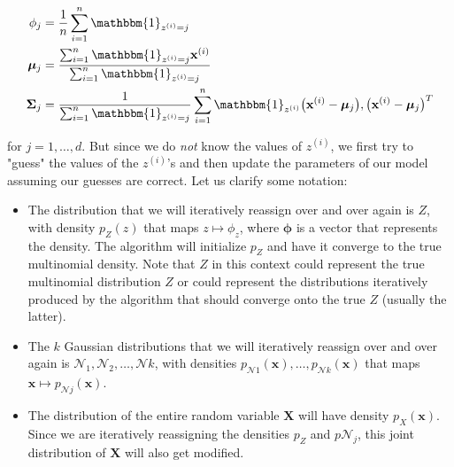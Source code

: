       \begin{align*}
        \phi_j & = \frac{1}{n} \sum_{i=1}^n \mathbbm{1}_{z^{(i)} = j} \\
        \boldsymbol{\mu}_j & = \frac{\sum_{i=1}^n \mathbbm{1}_{z^{(i)} = j} \mathbf{x}^{(i)}}{\sum_{i=1}^n \mathbbm{1}_{z^{(i)} = j}} \\
        \boldsymbol{\Sigma}_j & = \frac{1}{\sum_{i=1}^n \mathbbm{1}_{z^{(i)} = j}} \sum_{i=1}^n \mathbbm{1}_{z^{(i)}} \big( \mathbf{x}^{(i)} - \boldsymbol{\mu}_j \big),\big(\mathbf{x}^{(i)} - \boldsymbol{\mu}_j \big)^T
      \end{align*}

      for $j = 1, \ldots, d$. But since we do \textit{not} know the values of $z^{(i)}$, we first try to "guess" the values of the $z^{(i)}$'s and then update the parameters of our model assuming our guesses are correct. Let us clarify some notation:

      \begin{itemize}
        \item The distribution that we will iteratively reassign over and over again is $Z$, with density $p_Z (z)$ that maps $z \mapsto \phi_z$, where $\boldsymbol{\phi}$ is a vector that represents the density. The algorithm will initialize $p_Z$ and have it converge to the true multinomial density. Note that $Z$ in this context could represent the true multinomial distribution $Z$ or could represent the distributions iteratively produced by the algorithm that should converge onto the true $Z$ (usually the latter).

        \item The $k$ Gaussian distributions that we will iteratively reassign over and over again is $\mathcal{N}_1, \mathcal{N}_2, \ldots, \mathcal{N}k$, with densities $p_{\mathcal{N}1}(\mathbf{x}), \ldots, p_{\mathcal{N}k}(\mathbf{x})$ that maps $\mathbf{x} \mapsto p_{\mathcal{N}j}(\mathbf{x})$.

        \item The distribution of the entire random variable $\mathbf{X}$ will have density $p_X(\mathbf{x})$. Since we are iteratively reassigning the densities $p_Z$ and $p{\mathcal{N}_j}$, this joint distribution of $\mathbf{X}$ will also get modified.
      \end{itemize}


